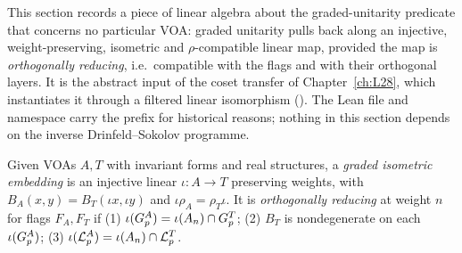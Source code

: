 This section records a piece of linear algebra about the graded-unitarity predicate that concerns no particular VOA:
graded unitarity pulls back along an injective, weight-preserving, isometric and $\rho$-compatible linear map,
provided the map is \emph{orthogonally reducing}, i.e.\ compatible with the flags and with their orthogonal layers. It
is the abstract input of the coset transfer of Chapter~\ref{ch:L28}, which instantiates it through a filtered linear
isomorphism (). The Lean file and namespace carry the prefix
 for historical reasons; nothing in this section depends on the inverse Drinfeld--Sokolov programme.

\begin{definition}\label{l19:def:gie}
Given VOAs $A,T$ with invariant forms and real structures, a \emph{graded isometric embedding} is an injective
linear $\iota:A\to T$ preserving weights, with $B_A(x,y) = B_T(\iota x,\iota y)$ and $\iota\rho_A = \rho_T\iota$.
It is \emph{orthogonally reducing} at weight $n$ for flags $F_A,F_T$ if (1) $\iota(G^A_p) =
\iota(A_n)\cap G^T_p$; (2) $B_T$ is nondegenerate on each $\iota(G^A_p)$; (3)
$\iota(\mathcal{L}^A_p) = \iota(A_n)\cap\mathcal{L}^T_p$.
\end{definition}

